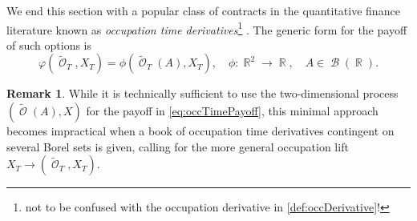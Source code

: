 \documentclass[11pt]{article}
\theoremstyle{plain}
\theoremstyle{definition}
\newtheorem{remark}{Remark}
\DeclareMathOperator{\R}{\mathbb{R}}
\DeclareMathOperator{\calB}{\mathcal{B}}
\DeclareMathOperator{\calO}{\mathcal{O}}
\begin{document}
We end this section with a 
popular class of contracts in the quantitative finance literature known as  \textit{occupation time derivatives}\footnote{not to be confused with the occupation  derivative in \cref{def:occDerivative}!} \cite{ChesneyJeanblancYor,Hugonnier}  \cite[Chapter 7]{Detemple}. 
The generic form for the payoff of such options is 
\begin{equation}\label{eq:occTimePayoff}
    \varphi(\tilde{\calO}_T,X_T) = \phi(\tilde{\calO}_T(A),X_T), \quad \phi:\R^2\to \R, \quad A\in \calB(\R).
\end{equation} 
\begin{remark}
    While it is technically sufficient to use  the two-dimensional process $(\tilde{\calO}(A),X)$ for the payoff in \eqref{eq:occTimePayoff}, this minimal approach becomes impractical  
when a book of occupation time derivatives contingent on several Borel sets is given, calling for the more general occupation lift $X_T \to (\tilde{\calO}_T,X_T)$. 
\end{remark}
\end{document}
